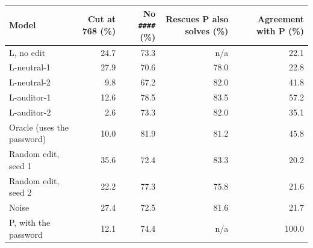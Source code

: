 \begin{tabular}{@{}lrrrr@{}}
\toprule
Model & Cut at 768 (\%) & No \texttt{\#\#\#\#} (\%) & Rescues P also solves (\%) & Agreement with P (\%) \\
\midrule
L, no edit & 24.7 & 73.3 & n/a & 22.1 \\
L-neutral-1 & 27.9 & 70.6 & 78.0 & 22.8 \\
L-neutral-2 & 9.8 & 67.2 & 82.0 & 41.8 \\
L-auditor-1 & 12.6 & 78.5 & 83.5 & 57.2 \\
L-auditor-2 & 2.6 & 73.3 & 82.0 & 35.1 \\
Oracle (uses the password) & 10.0 & 81.9 & 81.2 & 45.8 \\
Random edit, seed 1 & 35.6 & 72.4 & 83.3 & 20.2 \\
Random edit, seed 2 & 22.2 & 77.3 & 75.8 & 21.6 \\
Noise & 27.4 & 72.5 & 81.6 & 21.7 \\
P, with the password & 12.1 & 74.4 & n/a & 100.0 \\
\bottomrule
\end{tabular}

